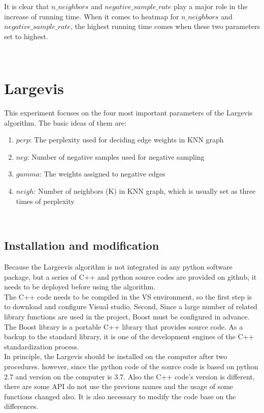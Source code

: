 \begin{enumerate}[1)]
It is clear that $n\_neighbors$ and $negative\_sample\_rate$  play a major role in the increase of running time. When it comes to heatmap for $n\_neighbors$ and $negative\_sample\_rate$, the highest running time comes when these two parameters set to highest.

\end{enumerate}\\

\section{Largevis}

This experiment focuses on the four most important parameters of the Largevis algorithm. The basic ideas of them are:

\begin{enumerate}[1)]
\item $perp$: The perplexity used for deciding edge weights in KNN graph
\item $neg$: Number of negative samples used for negative sampling
\item $gamma$: The weights assigned to negative edges
\item $neigh$: Number of neighbors (K) in KNN graph, which is usually set as three times of perplexity
\end{enumerate}\\

\subsection{Installation and modification}

Because the Largeevis algorithm is not integrated in any python software package, but a series of C++ and python source codes are provided on github, it needs to be deployed before using the algorithm. \\

\noindent The C++ code needs to be compiled in the VS environment, so the first step is to download and configure Visual studio. Second, Since a large number of related library functions are used in the project, Boost must be configured in advance. The Boost library is a portable C++ library that provides source code. As a backup to the standard library, it is one of the development engines of the C++ standardization process.\\

\noindent In principle, the Largevis should be installed on the computer after two procedures. however, since the python code of the source code is based on python 2.7 and version on the computer is 3.7. Also the C++ code's version is different, there are some API do not use the previous names and the usage of some functions changed also. It is also necessary to modify the code base on the differences. 

